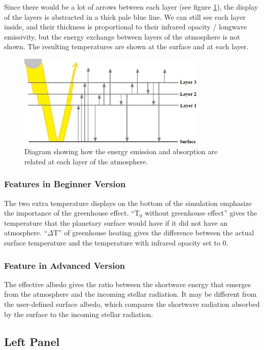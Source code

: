 \documentclass[a4paper,12pt]{article}
\begin{document}
Since there would be a lot of arrows between each layer (see figure \ref{fig:model}), the display of the layers is abstracted in a thick pale blue line. We can still see each layer inside, and their thickness is proportional to their infrared opacity / longwave emissivity, but the energy exchange between layers of the atmosphere is not shown. The resulting temperatures are shown at the surface and at each layer.

\begin{figure}[H]
  \centering
  \includegraphics[width=90mm]{Model}
  \caption{Diagram showing how the energy emission and absorption are related at each layer of the atmosphere.}
  \label{fig:model}
\end{figure}

\subsubsection*{Features in Beginner Version}
The two extra temperature displays on the bottom of the simulation emphasize the importance of the greenhouse effect. ``T$_0$ without greenhouse effect'' gives the temperature that the planetary surface would have if it did not have an atmosphere. ``$\Delta $T'' of greenhouse heating gives the difference between the actual surface temperature  and the temperature with infrared opacity set to 0.

\subsubsection*{Feature in Advanced Version}
The effective albedo gives the ratio between the shortwave energy that emerges from the atmosphere and the incoming stellar radiation. It may be different from the user-defined surface albedo, which compares the shortwave radiation absorbed by the surface to the incoming stellar radiation. 

\subsection*{Left Panel}
\end{document}
